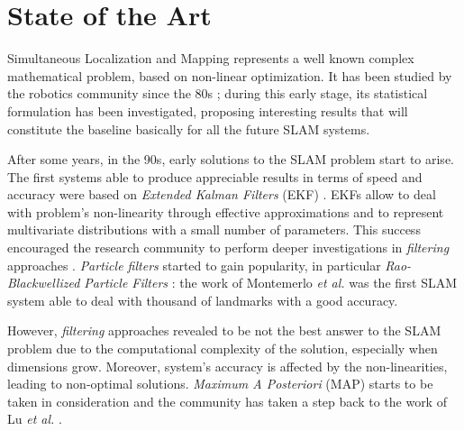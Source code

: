 \chapter{State of the Art}\label{ch:related}
\lettrine[lines=2]{S}{}imultaneous Localization and Mapping represents a well known complex mathematical problem, based on non-linear optimization. It has been studied by the robotics community since the 80s \cite{durrant2006simultaneous} \cite{bailey2006simultaneous}; during this early stage, its statistical formulation has been investigated, proposing interesting results that will constitute the baseline basically for all the future SLAM systems.

After some years, in the 90s, early solutions to the SLAM problem start to arise. The first systems able to produce appreciable results in terms of speed and accuracy were based on \textit{Extended Kalman Filters} (EKF) \cite{leonard1990dynamic} \cite{dissanayake2001solution}. EKFs allow to deal with problem's non-linearity through effective approximations and to represent multivariate distributions with a small number of parameters. This success encouraged the research community to perform deeper investigations in \textit{filtering} approaches \cite{aulinas2008filtering_review}. \textit{Particle filters} started to gain popularity, in particular \textit{Rao-Blackwellized Particle Filters} \cite{grisetti2005improving}: the work of Montemerlo \textit{et al.} \cite{montemerlo2002fastslam} was the first SLAM system able to deal with thousand of landmarks with a good accuracy. 

However, \textit{filtering} approaches revealed to be not the best answer to the SLAM problem due to the computational complexity of the solution, especially when dimensions grow. Moreover, system's accuracy is affected by the non-linearities, leading to non-optimal solutions. \textit{Maximum A Posteriori} (MAP) starts to be taken in consideration and the community has taken a step back to the work of Lu \textit{et al.} \cite{lu1997globally}.